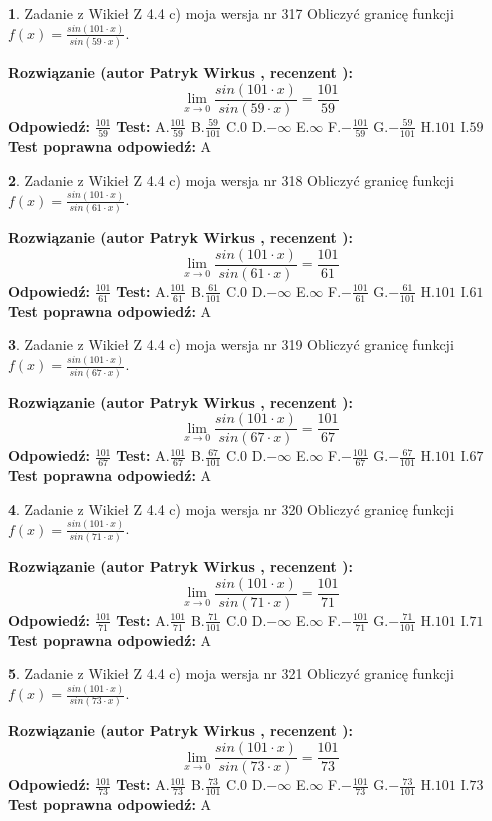 \documentclass[12pt, a4paper]{article}
\theoremstyle{definition} %
\newtheorem{zad}{}
\newcommand{\zadStart}[1]{\begin{zad}#1\newline}
\newcommand{\zadStop}{\end{zad}}
\newcommand{\rozwStart}[2]{\noindent \textbf{Rozwiązanie (autor #1 , recenzent #2): }\newline}
\newcommand{\rozwStop}{\newline}
\newcommand{\odpStart}{\noindent \textbf{Odpowiedź:}\newline}
\newcommand{\odpStop}{\newline}
\newcommand{\testStart}{\noindent \textbf{Test:}\newline}
\newcommand{\testStop}{\newline}
\newcommand{\kluczStart}{\noindent \textbf{Test poprawna odpowiedź:}\newline}
\newcommand{\kluczStop}{\newline}
\begin{document}
\zadStart{Zadanie z Wikieł Z 4.4 c) moja wersja nr 317}
Obliczyć granicę funkcji $f(x)=\frac{sin(101\cdot x)}{sin(59\cdot x)}$.
\zadStop
\rozwStart{Patryk Wirkus}{}
$$\lim\limits_{x\to 0}\frac{sin(101\cdot x)}{sin(59\cdot x)}=
\frac{101}{59}$$
\rozwStop
\odpStart
$\frac{101}{59}$
\odpStop
\testStart
A.$\frac{101}{59}$
B.$\frac{59}{101}$
C.$0$
D.$-\infty$
E.$\infty$
F.$-\frac{101}{59}$
G.$-\frac{59}{101}$
H.$101$
I.$59$
\testStop
\kluczStart
A
\kluczStop



\zadStart{Zadanie z Wikieł Z 4.4 c) moja wersja nr 318}
Obliczyć granicę funkcji $f(x)=\frac{sin(101\cdot x)}{sin(61\cdot x)}$.
\zadStop
\rozwStart{Patryk Wirkus}{}
$$\lim\limits_{x\to 0}\frac{sin(101\cdot x)}{sin(61\cdot x)}=
\frac{101}{61}$$
\rozwStop
\odpStart
$\frac{101}{61}$
\odpStop
\testStart
A.$\frac{101}{61}$
B.$\frac{61}{101}$
C.$0$
D.$-\infty$
E.$\infty$
F.$-\frac{101}{61}$
G.$-\frac{61}{101}$
H.$101$
I.$61$
\testStop
\kluczStart
A
\kluczStop



\zadStart{Zadanie z Wikieł Z 4.4 c) moja wersja nr 319}
Obliczyć granicę funkcji $f(x)=\frac{sin(101\cdot x)}{sin(67\cdot x)}$.
\zadStop
\rozwStart{Patryk Wirkus}{}
$$\lim\limits_{x\to 0}\frac{sin(101\cdot x)}{sin(67\cdot x)}=
\frac{101}{67}$$
\rozwStop
\odpStart
$\frac{101}{67}$
\odpStop
\testStart
A.$\frac{101}{67}$
B.$\frac{67}{101}$
C.$0$
D.$-\infty$
E.$\infty$
F.$-\frac{101}{67}$
G.$-\frac{67}{101}$
H.$101$
I.$67$
\testStop
\kluczStart
A
\kluczStop



\zadStart{Zadanie z Wikieł Z 4.4 c) moja wersja nr 320}
Obliczyć granicę funkcji $f(x)=\frac{sin(101\cdot x)}{sin(71\cdot x)}$.
\zadStop
\rozwStart{Patryk Wirkus}{}
$$\lim\limits_{x\to 0}\frac{sin(101\cdot x)}{sin(71\cdot x)}=
\frac{101}{71}$$
\rozwStop
\odpStart
$\frac{101}{71}$
\odpStop
\testStart
A.$\frac{101}{71}$
B.$\frac{71}{101}$
C.$0$
D.$-\infty$
E.$\infty$
F.$-\frac{101}{71}$
G.$-\frac{71}{101}$
H.$101$
I.$71$
\testStop
\kluczStart
A
\kluczStop



\zadStart{Zadanie z Wikieł Z 4.4 c) moja wersja nr 321}
Obliczyć granicę funkcji $f(x)=\frac{sin(101\cdot x)}{sin(73\cdot x)}$.
\zadStop
\rozwStart{Patryk Wirkus}{}
$$\lim\limits_{x\to 0}\frac{sin(101\cdot x)}{sin(73\cdot x)}=
\frac{101}{73}$$
\rozwStop
\odpStart
$\frac{101}{73}$
\odpStop
\testStart
A.$\frac{101}{73}$
B.$\frac{73}{101}$
C.$0$
D.$-\infty$
E.$\infty$
F.$-\frac{101}{73}$
G.$-\frac{73}{101}$
H.$101$
I.$73$
\testStop
\kluczStart
A
\kluczStop
\end{document}
